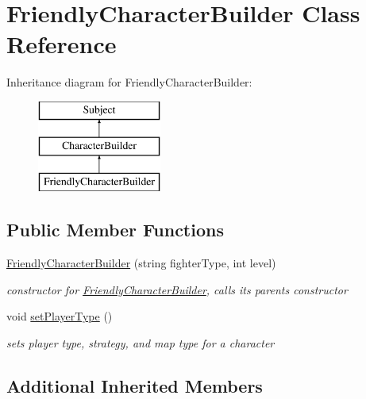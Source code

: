 \hypertarget{class_friendly_character_builder}{}\section{Friendly\+Character\+Builder Class Reference}
\label{class_friendly_character_builder}
Inheritance diagram for Friendly\+Character\+Builder\+:\begin{figure}[H]
\begin{center}
\leavevmode
\includegraphics[height=3.000000cm]{class_friendly_character_builder}
\end{center}
\end{figure}
\subsection*{Public Member Functions}
\begin{DoxyCompactItemize}
\item 
\hypertarget{class_friendly_character_builder_ac15869cb610f8ba24f73a044f42fa7e5}{}\label{class_friendly_character_builder_ac15869cb610f8ba24f73a044f42fa7e5} 
\hyperlink{class_friendly_character_builder_ac15869cb610f8ba24f73a044f42fa7e5}{Friendly\+Character\+Builder} (string fighter\+Type, int level)
\begin{DoxyCompactList}\small\item\em constructor for \hyperlink{class_friendly_character_builder}{Friendly\+Character\+Builder}, calls its parents constructor \end{DoxyCompactList}\item 
\hypertarget{class_friendly_character_builder_a8cf44da0c7b2d1cffc5800ce722dec90}{}\label{class_friendly_character_builder_a8cf44da0c7b2d1cffc5800ce722dec90} 
void \hyperlink{class_friendly_character_builder_a8cf44da0c7b2d1cffc5800ce722dec90}{set\+Player\+Type} ()
\begin{DoxyCompactList}\small\item\em sets player type, strategy, and map type for a character \end{DoxyCompactList}\end{DoxyCompactItemize}
\subsection*{Additional Inherited Members}


